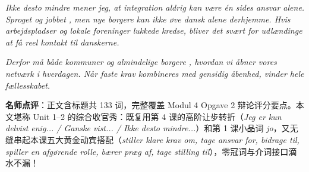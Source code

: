\begin{answerbox}
\textit{Ikke desto mindre mener jeg, at integration aldrig kan være én sides ansvar alene. Sproget og jobbet , men nye borgere kan ikke øve dansk alene derhjemme. Hvis arbejdspladser og lokale foreninger  lukkede kredse, bliver det svært for udlændinge at få reel kontakt til danskerne.}

\textit{Derfor må både kommuner og almindelige borgere , hvordan vi åbner vores netværk i hverdagen. Når faste krav kombineres med gensidig åbenhed, vinder hele fællesskabet.}

\small\textbf{名师点评}：正文含标题共 133 词，完整覆盖 Modul 4 Opgave 2 辩论评分要点。本文堪称 Unit 1--2 的综合收官秀：既复用第 4 课的高阶让步转折（\textit{Jeg er kun delvist enig... / Ganske vist... / Ikke desto mindre...}）和第 1 课小品词 \textit{jo}，又无缝串起本课五大黄金动宾搭配（\textit{stiller klare krav om, tage ansvar for, bidrage til, spiller en afgørende rolle, bærer præg af, tage stilling til}），零冠词与介词接口滴水不漏！
\end{answerbox}